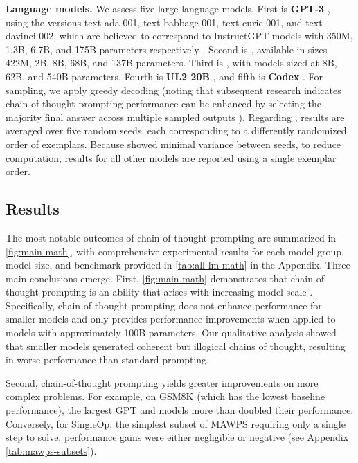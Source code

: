 \textbf{Language models.} We assess five large language models. First is \textbf{GPT-3} \citep{brown2020language}, using the versions text-ada-001, text-babbage-001, text-curie-001, and text-davinci-002, which are believed to correspond to InstructGPT models with 350M, 1.3B, 6.7B, and 175B parameters respectively \citep{ouyang2022training}. Second is \textbf{\lamda{}} \citep{thoppilan2022lamda}, available in sizes 422M, 2B, 8B, 68B, and 137B parameters. Third is \textbf{\palm{}}, with models sized at 8B, 62B, and 540B parameters. Fourth is \textbf{UL2 20B} \citep{tay2022unifying}, and fifth is \textbf{Codex} \citep[][code-davinci-002 in the OpenAI API]{chen2021evaluating}. For sampling, we apply greedy decoding (noting that subsequent research indicates chain-of-thought prompting performance can be enhanced by selecting the majority final answer across multiple sampled outputs \citep{wang2022self}). Regarding \lamda{}, results are averaged over five random seeds, each corresponding to a differently randomized order of exemplars. Because \lamda{} showed minimal variance between seeds, to reduce computation, results for all other models are reported using a single exemplar order.

\subsection{Results}
The most notable outcomes of chain-of-thought prompting are summarized in \cref{fig:main-math}, with comprehensive experimental results for each model group, model size, and benchmark provided in \cref{tab:all-lm-math} in the Appendix. Three main conclusions emerge. First, \cref{fig:main-math} demonstrates that chain-of-thought prompting is an ability that arises with increasing model scale \citep{wei2022emergent}. Specifically, chain-of-thought prompting does not enhance performance for smaller models and only provides performance improvements when applied to models with approximately 100B parameters. Our qualitative analysis showed that smaller models generated coherent but illogical chains of thought, resulting in worse performance than standard prompting.


Second, chain-of-thought prompting yields greater improvements on more complex problems. For example, on GSM8K (which has the lowest baseline performance), the largest GPT and \palm{} models more than doubled their performance. Conversely, for SingleOp, the simplest subset of MAWPS requiring only a single step to solve, performance gains were either negligible or negative (see Appendix \cref{tab:mawps-subsets}).

